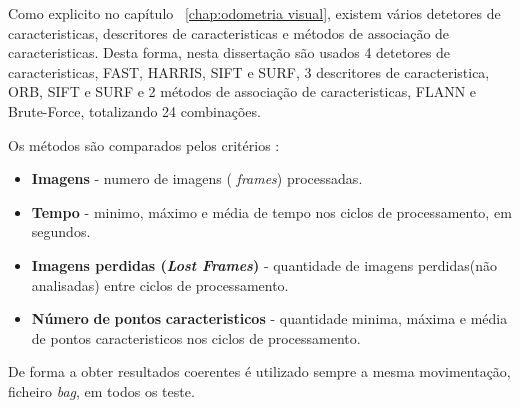 Como explicito no capítulo ~\ref{chap:odometria visual}, existem vários detetores de caracteristicas, descritores de caracteristicas e métodos de associação de caracteristicas. Desta forma, nesta dissertação são usados 4 detetores de caracteristicas, FAST, HARRIS, SIFT e SURF, 3 descritores de caracteristica, ORB, SIFT e SURF e 2 métodos de associação de caracteristicas, FLANN e Brute-Force, totalizando 24 combinações.

Os métodos são comparados pelos critérios :
\begin{itemize}
	\item \textbf{Imagens} - numero de imagens ( \textit{frames}) processadas.
	\item \textbf{Tempo} - minimo, máximo e média de tempo nos ciclos de processamento, em segundos.
	\item \textbf{Imagens perdidas (\textit{Lost Frames})} - quantidade de imagens perdidas(não analisadas) entre ciclos de processamento.
	\item \textbf{Número} \textbf{de} \textbf{pontos} \textbf{caracteristicos} - quantidade minima, máxima e média de pontos caracteristicos nos ciclos de processamento.
\end{itemize}


De forma a obter resultados coerentes é utilizado sempre a mesma movimentação, ficheiro \textit{bag}, em todos os teste. 




